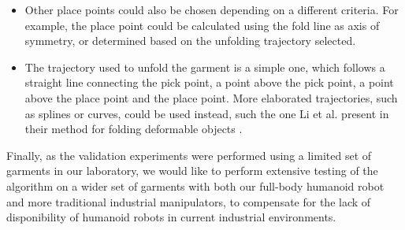 \begin{enumerate}
\begin{itemize}
\item Other place points could also be chosen depending on a different criteria. For example, the place point could be calculated using the fold line as axis of symmetry, or determined based on the unfolding trajectory selected.	

\item The trajectory used to unfold the garment is a simple one, which follows a straight line connecting the pick point, a point above the pick point, a point above the place point and the place point. More elaborated trajectories, 
\pagebreak
such as splines or curves, could be used instead, such the one Li et al. present in their method for folding deformable objects \cite{Li2015IROS}.

\end{itemize}
\end{enumerate}

Finally, as the validation experiments were performed using a limited set of garments in our laboratory, we would like to perform extensive testing of the algorithm on a wider set of garments with both our full-body humanoid robot and more traditional industrial manipulators, to compensate for the lack of disponibility of humanoid robots in current industrial environments.
